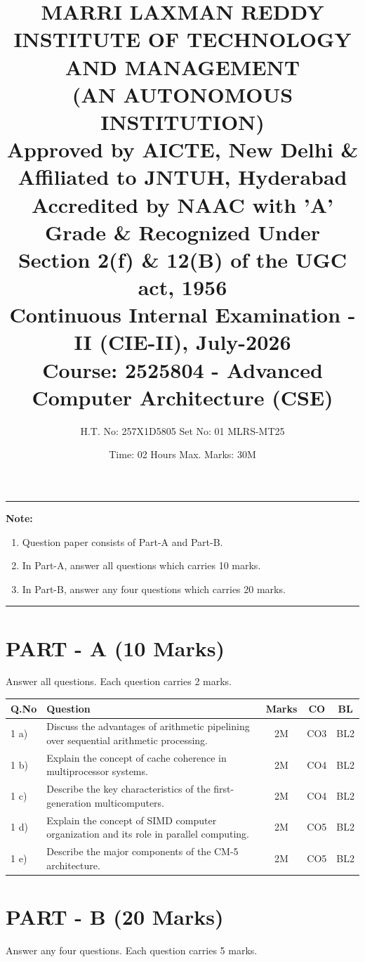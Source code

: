 \documentclass[11pt, a4paper]{article}
\title{
    \large\bfseries MARRI LAXMAN REDDY INSTITUTE OF TECHNOLOGY AND MANAGEMENT \\
    \small\mdseries (AN AUTONOMOUS INSTITUTION) \\
    \footnotesize Approved by AICTE, New Delhi \& Affiliated to JNTUH, Hyderabad \\
    Accredited by NAAC with 'A' Grade \& Recognized Under Section 2(f) \& 12(B) of the UGC act, 1956 \\
    \vspace{0.4cm}
    \large Continuous Internal Examination - II (CIE-II), July-2026 \\
    \normalsize Course: 2525804 - Advanced Computer Architecture (CSE)
}
\author{H.T. No: 257X1D5805 \hfill Set No: 01 \hfill MLRS-MT25}
\date{Time: 02 Hours \hfill Max. Marks: 30M}
\begin{document}
\maketitle

\hrule
\vspace{0.2cm}
\noindent\textbf{Note:}
\begin{enumerate}
    \item Question paper consists of Part-A and Part-B.
    \item In Part-A, answer all questions which carries 10 marks.
    \item In Part-B, answer any four questions which carries 20 marks.
\end{enumerate}
\hrule
\vspace{0.4cm}

\section*{PART - A (10 Marks)}
\noindent Answer all questions. Each question carries 2 marks.

\begin{table}[htbp]
    \centering
    \begin{tabular}{lp{10cm}ccc}
        \toprule
        Q.No & Question & Marks & CO & BL \\
        \midrule
        1 a) & Discuss the advantages of arithmetic pipelining over sequential arithmetic processing. & 2M & CO3 & BL2 \\
        1 b) & Explain the concept of cache coherence in multiprocessor systems. & 2M & CO4 & BL2 \\
        1 c) & Describe the key characteristics of the first-generation multicomputers. & 2M & CO4 & BL2 \\
        1 d) & Explain the concept of SIMD computer organization and its role in parallel computing. & 2M & CO5 & BL2 \\
        1 e) & Describe the major components of the CM-5 architecture. & 2M & CO5 & BL2 \\
        \bottomrule
    \end{tabular}
\end{table}

\section*{PART - B (20 Marks)}
\noindent Answer any four questions. Each question carries 5 marks.
\end{document}
